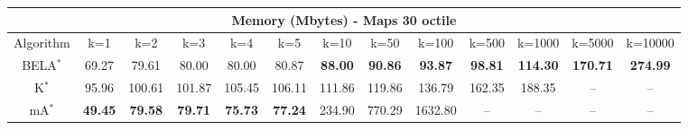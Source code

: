 \begin{tabular}{c|cccccccccccc}\toprule
\multicolumn{13}{c}{Memory (Mbytes) - Maps 30 octile}\\ \midrule
Algorithm & k=1 & k=2 & k=3 & k=4 & k=5 & k=10 & k=50 & k=100 & k=500 & k=1000 & k=5000 & k=10000 \\ \midrule
BELA$^*$ & 69.27 & 79.61 & 80.00 & 80.00 & 80.87 & \textbf{88.00} & \textbf{90.86} & \textbf{93.87} & \textbf{98.81} & \textbf{114.30} & \textbf{170.71} & \textbf{274.99} \\
K$^*$ & 95.96 & 100.61 & 101.87 & 105.45 & 106.11 & 111.86 & 119.86 & 136.79 & 162.35 & 188.35 & -- & -- \\
mA$^*$ & \textbf{49.45} & \textbf{79.58} & \textbf{79.71} & \textbf{75.73} & \textbf{77.24} & 234.90 & 770.29 & 1632.80 & -- & -- & -- & -- \\ \bottomrule 
\end{tabular}
